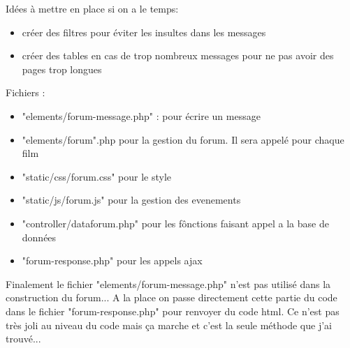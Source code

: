                 \bigskip
                Idées à mettre en place si on a le temps:
                \begin{itemize}
                    \item créer des filtres pour éviter les insultes dans les messages
                    \item créer des tables en cas de trop nombreux messages pour ne pas avoir des pages trop longues 
                \end{itemize}

                \bigskip
                Fichiers :
                \begin{itemize}
                    \item "elements/forum-message.php" : pour écrire un message
                    \item "elements/forum".php pour la gestion du forum. Il sera appelé pour chaque film
                    \item "static/css/forum.css" pour le style
                    \item "static/js/forum.js" pour la gestion des evenements
                    \item "controller/dataforum.php" pour les fônctions faisant appel a la base de données
                    \item "forum-response.php" pour les appels ajax
                \end{itemize}

                Finalement le fichier "elements/forum-message.php" n'est pas utilisé dans la construction du forum... A la place on passe directement cette partie du code dans le fichier "forum-response.php" pour renvoyer du code html. Ce n'est pas très joli au niveau du code mais ça marche et c'est la seule méthode que j'ai trouvé...